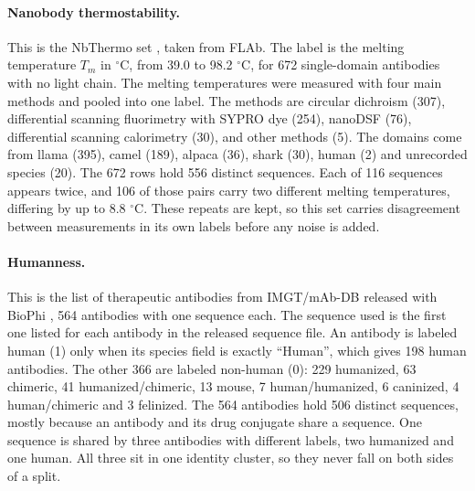 \paragraph{Nanobody thermostability.} This is the NbThermo set \citep{ValdesTresanco2023}, taken from FLAb. The label is the melting temperature $T_m$ in $^\circ$C, from 39.0 to 98.2 $^\circ$C, for 672 single-domain antibodies with no light chain. The melting temperatures were measured with four main methods and pooled into one label. The methods are circular dichroism (307), differential scanning fluorimetry with SYPRO dye (254), nanoDSF (76), differential scanning calorimetry (30), and other methods (5). The domains come from llama (395), camel (189), alpaca (36), shark (30), human (2) and unrecorded species (20). The 672 rows hold 556 distinct sequences. Each of 116 sequences appears twice, and 106 of those pairs carry two different melting temperatures, differing by up to 8.8 $^\circ$C. These repeats are kept, so this set carries disagreement between measurements in its own labels before any noise is added.

\paragraph{Humanness.} This is the list of therapeutic antibodies from IMGT/mAb-DB released with BioPhi \citep{Prihoda2022}, 564 antibodies with one sequence each. The sequence used is the first one listed for each antibody in the released sequence file. An antibody is labeled human (1) only when its species field is exactly ``Human'', which gives 198 human antibodies. The other 366 are labeled non-human (0): 229 humanized, 63 chimeric, 41 humanized/chimeric, 13 mouse, 7 human/humanized, 6 caninized, 4 human/chimeric and 3 felinized. The 564 antibodies hold 506 distinct sequences, mostly because an antibody and its drug conjugate share a sequence. One sequence is shared by three antibodies with different labels, two humanized and one human. All three sit in one identity cluster, so they never fall on both sides of a split.

